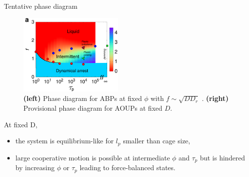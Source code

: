 \documentclass{beamer}
\begin{document}
\begin{frame}{Tentative phase diagram}

\begin{figure}
\centering
\includegraphics[height=4cm]{mandal2020_fig1a.png}

\caption{{\bf (left)} Phase diagram for ABPs at fixed $\phi$ with $f \sim \sqrt{D D_r}$ . {\bf (right)} Provisional phase diagram for AOUPs at fixed $D$.}
\end{figure}

At fixed D,
\begin{itemize}
  \item the system is equilibrium-like for $l_p$ smaller than cage size,
  \item large cooperative motion is possible at intermediate $\phi$ and $\tau_p$ but is hindered by increasing $\phi$ or $\tau_p$ leading to force-balanced states.
\end{itemize}

\end{frame}
\end{document}
